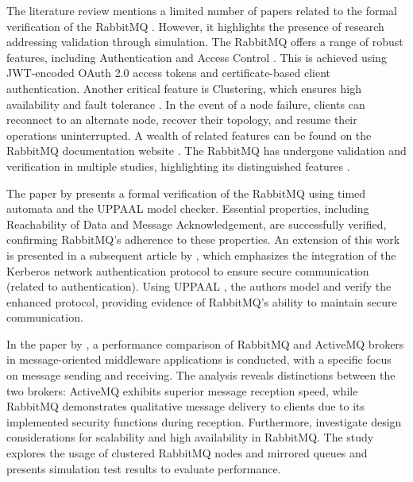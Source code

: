 The literature review mentions a limited number of papers related to the formal verification of the RabbitMQ . However, it highlights the presence of research addressing validation through simulation. The RabbitMQ  offers a range of robust features, including Authentication and Access Control \cite{rabbitmq-access-control}. This is achieved using JWT-encoded OAuth 2.0 access tokens \cite{rfc6749} and certificate-based client authentication. Another critical feature is Clustering, which ensures high availability and fault tolerance \cite{rabbitmq-clustering}. In the event of a node failure, clients can reconnect to an alternate node, recover their topology, and resume their operations uninterrupted. A wealth of related features can be found on the RabbitMQ documentation website \cite{rabbitmq-docs}. The RabbitMQ  has undergone validation and verification in multiple studies, highlighting its distinguished features \cite{Li2020, Li2022, Ionescu2015, Hong2018, Bagaskara2020, Rostanski2014}.

The paper by  \citeauthor{Li2020} \cite{Li2020} presents a formal verification of the RabbitMQ  using timed automata and the UPPAAL model checker\cite{behrmann2006uppaal}. Essential properties, including Reachability of Data and Message Acknowledgement, are successfully verified, confirming RabbitMQ's adherence to these properties. An extension of this work is presented in a subsequent article by \citeauthor{Li2022}  \cite{Li2022}, which emphasizes the integration of the Kerberos network authentication protocol \cite{Neuman1994}  to ensure secure communication (related to authentication). Using UPPAAL \cite{behrmann2006uppaal}, the authors model and verify the enhanced protocol, providing evidence of RabbitMQ's ability to maintain secure communication.

In the paper by \citeauthor{Ionescu2015} \cite{Ionescu2015}, a performance comparison of RabbitMQ and ActiveMQ \cite{activemq} brokers in message-oriented middleware applications is conducted, with a specific focus on message sending and receiving. The analysis reveals distinctions between the two brokers: ActiveMQ exhibits superior message reception speed, while RabbitMQ demonstrates qualitative message delivery to clients due to its implemented security functions during reception. Furthermore, \citeauthor{Rostanski2014} \cite{Rostanski2014}  investigate design considerations for scalability and high availability in RabbitMQ. The study explores the usage of clustered RabbitMQ nodes and mirrored queues and presents simulation test results to evaluate performance.

